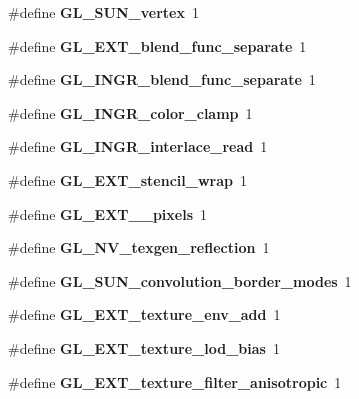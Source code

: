 \begin{DoxyCompactItemize}
\item 
\#define {\bfseries G\+L\+\_\+\+S\+U\+N\+\_\+vertex}~1\label{_s_d_l__opengl_8h_afcd8fe488bd2d61c8da3e192b2d67406}

\item 
\#define {\bfseries G\+L\+\_\+\+E\+X\+T\+\_\+blend\+\_\+func\+\_\+separate}~1\label{_s_d_l__opengl_8h_a70773e54a4b2644ef2fb2ceb133f51cb}

\item 
\#define {\bfseries G\+L\+\_\+\+I\+N\+G\+R\+\_\+blend\+\_\+func\+\_\+separate}~1\label{_s_d_l__opengl_8h_af9d8cbd6d67bfe65ed81028b3c97f571}

\item 
\#define {\bfseries G\+L\+\_\+\+I\+N\+G\+R\+\_\+color\+\_\+clamp}~1\label{_s_d_l__opengl_8h_a6b9c995ee6c809f27c8f5a00d8905093}

\item 
\#define {\bfseries G\+L\+\_\+\+I\+N\+G\+R\+\_\+interlace\+\_\+read}~1\label{_s_d_l__opengl_8h_a18d2d401058825b6f3b867e075771162}

\item 
\#define {\bfseries G\+L\+\_\+\+E\+X\+T\+\_\+stencil\+\_\+wrap}~1\label{_s_d_l__opengl_8h_ac386f9931d26d122956d994c9943bf54}

\item 
\#define {\bfseries G\+L\+\_\+\+E\+X\+T\+\_\+\_\+pixels}~1\label{_s_d_l__opengl_8h_a92f6047317bbaf986a560eb7c37c7d5c}

\item 
\#define {\bfseries G\+L\+\_\+\+N\+V\+\_\+texgen\+\_\+reflection}~1\label{_s_d_l__opengl_8h_a722d5ab1c417c2fce02fe629f2bbd5ab}

\item 
\#define {\bfseries G\+L\+\_\+\+S\+U\+N\+\_\+convolution\+\_\+border\+\_\+modes}~1\label{_s_d_l__opengl_8h_a706c7120f891da1207e72701c9134391}

\item 
\#define {\bfseries G\+L\+\_\+\+E\+X\+T\+\_\+texture\+\_\+env\+\_\+add}~1\label{_s_d_l__opengl_8h_a9253db4c5ca0924f231b7d96e9a60aab}

\item 
\#define {\bfseries G\+L\+\_\+\+E\+X\+T\+\_\+texture\+\_\+lod\+\_\+bias}~1\label{_s_d_l__opengl_8h_af9a0767ed458270595e03436cf5eb2ec}

\item 
\#define {\bfseries G\+L\+\_\+\+E\+X\+T\+\_\+texture\+\_\+filter\+\_\+anisotropic}~1\label{_s_d_l__opengl_8h_a67b45408b3b529072cba6ed496e7e5bc}


\end{DoxyCompactItemize}
